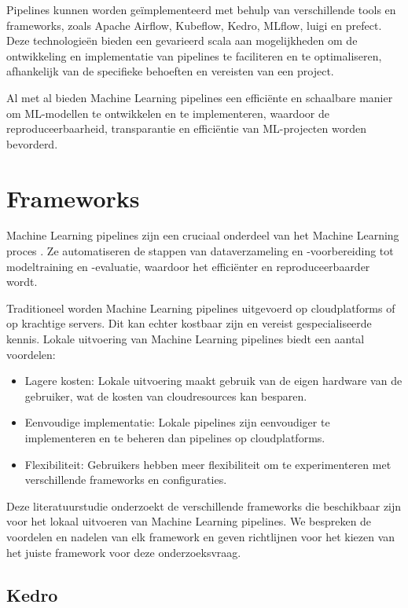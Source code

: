 Pipelines kunnen worden geïmplementeerd met behulp van verschillende tools en frameworks, zoals Apache Airflow, Kubeflow, Kedro, MLflow, luigi en prefect. Deze technologieën bieden een gevarieerd scala aan mogelijkheden om de ontwikkeling en implementatie van pipelines te faciliteren en te optimaliseren, afhankelijk van de specifieke behoeften en vereisten van een project.

Al met al bieden Machine Learning pipelines een efficiënte en schaalbare manier om ML-modellen te ontwikkelen en te implementeren, waardoor de reproduceerbaarheid, transparantie en efficiëntie van ML-projecten worden bevorderd.

\section{Frameworks}

Machine Learning pipelines zijn een cruciaal onderdeel van het Machine Learning proces \autocite{Jordan2015}. Ze automatiseren de stappen van dataverzameling en -voorbereiding tot modeltraining en -evaluatie, waardoor het efficiënter en reproduceerbaarder wordt.

Traditioneel worden Machine Learning pipelines uitgevoerd op cloudplatforms of op krachtige servers. Dit kan echter kostbaar zijn en vereist gespecialiseerde kennis. Lokale uitvoering van Machine Learning pipelines biedt een aantal voordelen:

\begin{itemize}
  \item Lagere kosten: Lokale uitvoering maakt gebruik van de eigen hardware van de gebruiker, wat de kosten van cloudresources kan besparen.
  \item Eenvoudige implementatie: Lokale pipelines zijn eenvoudiger te implementeren en te beheren dan pipelines op cloudplatforms.
  \item Flexibiliteit: Gebruikers hebben meer flexibiliteit om te experimenteren met verschillende frameworks en configuraties.
\end{itemize}

Deze literatuurstudie onderzoekt de verschillende frameworks die beschikbaar zijn voor het lokaal uitvoeren van Machine Learning pipelines. We bespreken de voordelen en nadelen van elk framework en geven richtlijnen voor het kiezen van het juiste framework voor deze onderzoeksvraag.
\subsection{Kedro}

